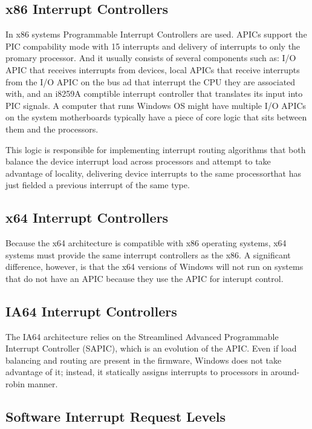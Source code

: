 \documentclass[letterpaper,10pt,draftclsnofoot,onecolumn]{IEEEtran}
\begin{document}
\subsection*{x86 Interrupt Controllers}

In x86 systems Programmable Interrupt Controllers are used. APICs support the PIC compability mode with 15 interrupts and delivery of interrupts to only the promary processor. And it usually consists of several components such as: I/O APIC that receives interrupts from devices, local APICs that receive interrupts from the I/O APIC on the bus ad that interrupt the CPU they are associated with, and an i8259A comptible interrupt controller that translates its input into PIC signals. A computer that runs Windows OS might have multiple I/O APICs on the system motherboards typically have a piece of core logic that sits between them and the processors. 

This logic is responsible for implementing interrupt routing algorithms that both balance the device interrupt load across processors and attempt to take advantage of locality, delivering device interrupts to the same processorthat has just fielded a previous interrupt of the same type.\cite{[1]}

\subsection*{x64 Interrupt Controllers}

Because the x64 architecture is compatible with x86 operating systems, x64 systems must provide the same interrupt controllers as the x86. A significant difference, however, is that the x64 versions of Windows will not run on systems that do not have an APIC because they use the APIC for interupt control.\cite{[1]}

\subsection*{IA64 Interrupt Controllers}

The IA64 architecture relies on the Streamlined Advanced Programmable Interrupt Controller (SAPIC), which is an evolution of the APIC. Even if load balancing and routing are present in the firmware, Windows does not take advantage of it; instead, it statically assigns interrupts to processors in around-robin manner.\cite{[1]}

\subsection*{Software Interrupt Request Levels}
\end{document}
